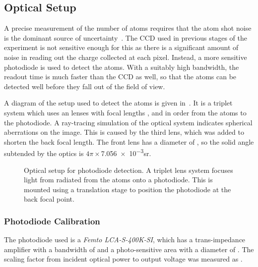 \subsection{Optical Setup}\label{subsec:optical_setup}
A precise measurement of the number of atoms requires that the atom shot noise
is the dominant source of uncertainty~\cite{Pappa2011}. The CCD used in
previous stages of the experiment is not sensitive enough for this as there is a
significant amount of noise in reading out the charge collected at each pixel.
Instead, a more sensitive photodiode is used to detect the atoms. With a
suitably high bandwidth, the readout time is much faster than the CCD as well,
so that the atoms can be detected well before they fall out of the field of
view. \par\noindent A diagram of the setup used to detect the atoms is given
in~. It is a triplet system which uses an
lenses with focal lengths ,
 and  in order from the
atoms to the photodiode.  A ray-tracing simulation of the optical
system indicates spherical aberrations on the image. This is caused by
the third lens, which was added to shorten the back focal length. The
front lens has a diameter of
, so the solid angle subtended by the
optics is \(4\pi \times\)\num{7.056e-3}\si{\steradian}.
\begin{figure}[!htbp] 
  \centering \fontsize{18pt}{18pt}
	\resizebox{0.7\textwidth}{!}{}
	\caption[Optical setup for Photodiode Detection]{Optical setup for photodiode
		detection. A triplet lens system focuses light from radiated from the atoms
		onto a photodiode. This is mounted using a translation stage to
  position the photodiode at the back focal point.}
  \label{fig:photodiode_optics}
\end{figure}

\subsubsection{Photodiode Calibration}
The photodiode used is a \textit{Femto LCA-S-400K-SI},
which has a trans-impedance amplifier with a bandwidth of  and a photo-sensitive area
with a diameter of . The scaling factor from
incident optical power to output voltage was measured as . 
